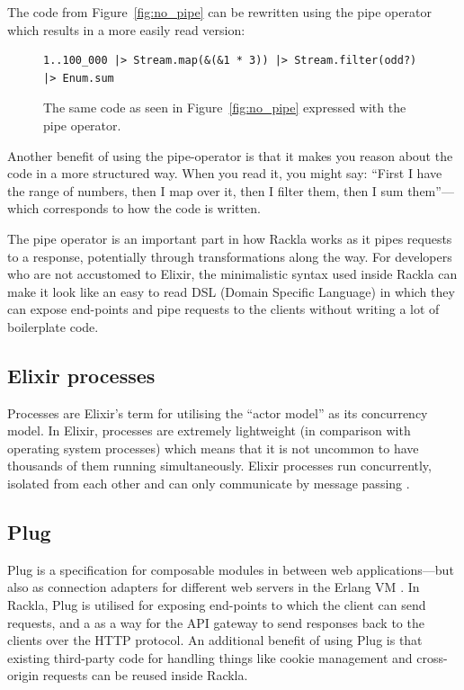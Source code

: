 \documentclass{cslthse-msc}
\begin{document}
\noindent The code from Figure~\ref{fig:no_pipe} can be rewritten using the pipe operator which results in a more easily read version:

\begin{figure}[H]
  \centering
\begin{lstlisting}[breaklines=true,frame=single]
1..100_000 |> Stream.map(&(&1 * 3)) |> Stream.filter(odd?) |> Enum.sum
\end{lstlisting}
  \caption{The same code as seen in Figure~\ref{fig:no_pipe} expressed with the pipe operator.}
\end{figure}

Another benefit of using the pipe-operator is that it makes you reason about the code in a more structured way. When you read it, you might say: \enquote{First I have the range of numbers, then I map over it, then I filter them, then I sum them}---which corresponds to how the code is written.

The pipe operator is an important part in how Rackla works as it pipes requests to a response, potentially through transformations along the way. For developers who are not accustomed to Elixir, the minimalistic syntax used inside Rackla can make it look like an easy to read DSL (Domain Specific Language) in which they can expose end-points and pipe requests to the clients without writing a lot of boilerplate code.

\subsection{Elixir processes}
Processes are Elixir's term for utilising the \enquote{actor model} as its concurrency model. In Elixir, processes are extremely lightweight (in comparison with operating system processes) which means that it is not uncommon to have thousands of them running simultaneously. Elixir processes run concurrently, isolated from each other and can only communicate by message passing \cite{elixir_processes}.

\subsection{Plug}
Plug is a specification for composable modules in between web applications---but also as connection adapters for different web servers in the Erlang VM \cite{plug}. In Rackla, Plug is utilised for exposing end-points to which the client can send requests, and a as a way for the API gateway to send responses back to the clients over the HTTP protocol. An additional benefit of using Plug is that existing third-party code for handling things like cookie management and cross-origin requests can be reused inside Rackla.
\end{document}
